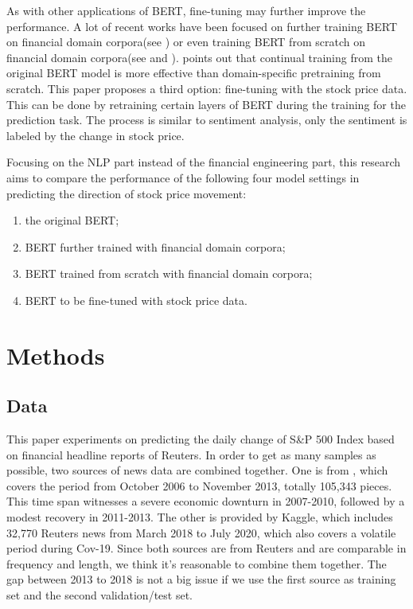 \documentclass[11pt]{article}
\begin{document}
As with other applications of BERT, fine-tuning may further improve the performance. A lot of recent works have been focused on further training BERT on financial domain corpora(see \citet{araci2019finbert}) or even training BERT from scratch on financial domain corpora(see \citet{yang2020finbert} and \citet{ijcai2020p622}). \citet{peng-etal-2021-domain} points out that continual training from the original BERT model is more effective than domain-specific pretraining from scratch. This paper proposes a third option: fine-tuning with the stock price data. This can be done by retraining certain layers of BERT during the training for the prediction task. The process is similar to sentiment analysis, only the sentiment is labeled by the change in stock price.

Focusing on the NLP part instead of the financial engineering part, this research aims to compare the performance of the following four model settings in predicting the direction of stock price movement:
\begin{enumerate}
    \item the original BERT;
    \item BERT further trained with financial domain corpora;
    \item BERT trained from scratch with financial domain corpora;
    \item BERT to be fine-tuned with stock price data.
\end{enumerate}


\section{Methods}


\subsection{Data}

This paper experiments on predicting the daily change of S&P 500 Index based on financial headline reports of Reuters. In order to get as many samples as possible, two sources of news data are combined together. One is from \citet{ding2014}, which covers the period from October 2006 to November 2013, totally 105,343 pieces. This time span witnesses a severe economic downturn in 2007-2010, followed by a modest recovery in 2011-2013. The other is provided by Kaggle, which includes 32,770 Reuters news from March 2018 to July 2020, which also covers a volatile period during Cov-19. Since both sources are from Reuters and are comparable in frequency and length, we think it's reasonable to combine them together. The gap between 2013 to 2018 is not a big issue if we use the first source as training set and the second validation/test set. 
\end{document}
